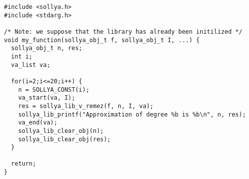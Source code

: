 \documentclass[a4paper]{article}
\begin{document}
\begin{center}\begin{minipage}{15cm}\begin{Verbatim}[frame=single]
#include <sollya.h>
#include <stdarg.h>

/* Note: we suppose that the library has already been initilized */
void my_function(sollya_obj_t f, sollya_obj_t I, ...) {
  sollya_obj_t n, res;
  int i;
  va_list va;

  for(i=2;i<=20;i++) {
    n = SOLLYA_CONST(i);
    va_start(va, I);
    res = sollya_lib_v_remez(f, n, I, va);
    sollya_lib_printf("Approximation of degree %b is %b\n", n, res);
    va_end(va);
    sollya_lib_clear_obj(n);
    sollya_lib_clear_obj(res);
  }

  return;
}
\end{Verbatim}
\end{minipage}\end{center}
\end{document}
